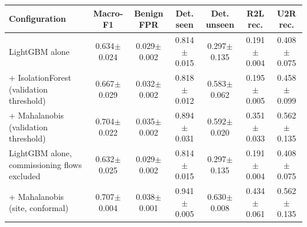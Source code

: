 \begin{tabular}{lcccccc}
\toprule
Configuration & Macro-F1 & Benign FPR & Det. seen & Det. unseen & R2L rec. & U2R rec. \\
\midrule
LightGBM alone & 0.634$\pm$0.024 & 0.029$\pm$0.002 & 0.814$\pm$0.015 & 0.297$\pm$0.135 & 0.191$\pm$0.004 & 0.408$\pm$0.075 \\
+ IsolationForest (validation threshold) & 0.667$\pm$0.029 & 0.032$\pm$0.002 & 0.818$\pm$0.012 & 0.583$\pm$0.062 & 0.195$\pm$0.005 & 0.458$\pm$0.099 \\
+ Mahalanobis (validation threshold) & 0.704$\pm$0.022 & 0.035$\pm$0.002 & 0.894$\pm$0.031 & 0.592$\pm$0.020 & 0.351$\pm$0.033 & 0.562$\pm$0.135 \\
LightGBM alone, commissioning flows excluded & 0.632$\pm$0.025 & 0.029$\pm$0.002 & 0.814$\pm$0.015 & 0.297$\pm$0.135 & 0.191$\pm$0.004 & 0.408$\pm$0.075 \\
+ Mahalanobis (site, conformal) & 0.707$\pm$0.004 & 0.038$\pm$0.001 & 0.941$\pm$0.005 & 0.630$\pm$0.008 & 0.434$\pm$0.061 & 0.562$\pm$0.135 \\
\bottomrule
\end{tabular}
